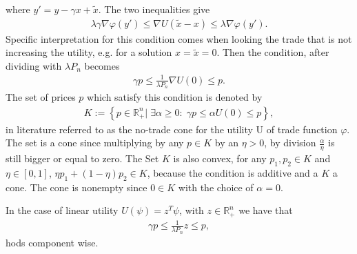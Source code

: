 where $y' = y-\gamma x + \tilde{x}$. The two inequalities give
\begin{align}
    \lambda \gamma \nabla \varphi(y') \le \nabla U(\tilde{x}-x)\le\lambda
    \nabla\varphi(y').
\end{align}
Specific interpretation for this condition comes when looking the trade that
is not increasing the utility, e.g. for a solution $x = \tilde{x} = 0$. Then
the condition, after dividing with $\lambda P_n$ becomes
\begin{align}
    \gamma p \le \frac{1}{\lambda P_n}\nabla U(0) \le p.
\end{align}
The set of prices $p$ which satisfy this condition is denoted by
\begin{align}
    K := \left\{p \in \mathbb{R}_+^{n}| \;\exists \alpha\ge0:\; \gamma p \le
    \alpha U(0) \le p \right\},
\end{align}
in literature referred to as the no-trade cone for the utility U of trade
function $\varphi$. The set is a cone since multiplying by any $p \in K$ by
an $\eta > 0$, by division $\frac{\alpha}{\eta}$ is still bigger or equal to
zero. The Set $K$ is also convex, for any $p_1, p_2 \in K$ and $\eta \in [0,
1]$, $\eta p_1 + (1-\eta)p_2 \in K$, because the condition is additive and a
$K$ a cone. The cone is nonempty since $0 \in K$ with the choice of $\alpha =
0$.

In the case of linear utility $U(\psi) = z^{T} \psi$, with $z \in
\mathbb{R}_+^{n}$ we have that
\begin{align}
    \gamma p \le \frac{1}{\lambda P_n}z \le p,
\end{align}
hods component wise.
